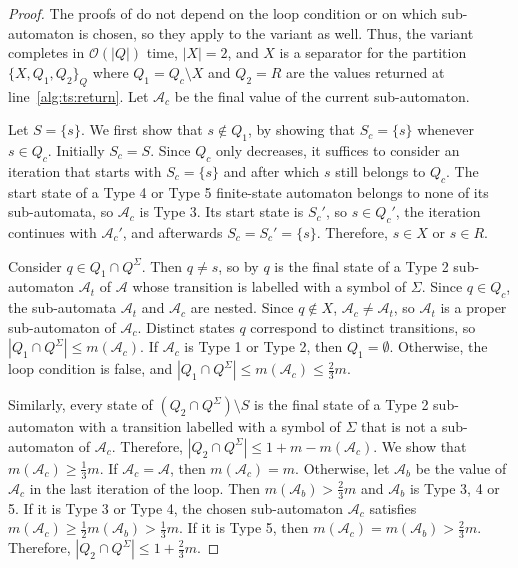 \begin{proof}
  The proofs of
  do not depend on the loop condition or on which sub-automaton is chosen, so they
  apply to the variant as well. Thus, the variant completes in $\mathcal{O}(|Q|)$ time,
  $|X| = 2$, and $X$ is a separator for the partition $\{ X, Q_1, Q_2 \}_Q$ where $Q_1 =
  Q_c \setminus X$ and $Q_2 = R$ are the values returned at line~\ref{alg:ts:return}.
  Let $\mathcal{A}_c$ be the final value of the current sub-automaton.

  Let $S = \{ s \}$. We first show that $s \not\in Q_1$, by showing that $S_c = \{ s
  \}$ whenever $s \in Q_c$. Initially $S_c = S$. Since $Q_c$ only decreases, it
  suffices to consider an iteration that starts with $S_c = \{ s \}$ and after which
  $s$ still belongs to $Q_c$. The start state of a Type 4 or Type 5 finite-state
  automaton belongs to none of its sub-automata, so $\mathcal{A}_c$ is Type 3. Its
  start state is $S_c'$, so $s \in Q_c'$, the iteration continues with
  $\mathcal{A}_c'$, and afterwards $S_c = S_c' = \{ s \}$. Therefore, $s \in X$ or $s
  \in R$.

  Consider $q \in Q_1 \cap Q^\Sigma$. Then $q \neq s$, so by
   $q$ is the final state of a Type 2 sub-automaton
  $\mathcal{A}_t$ of $\mathcal{A}$ whose transition is labelled with a symbol of
  $\Sigma$. Since $q \in Q_c$, the sub-automata $\mathcal{A}_t$ and $\mathcal{A}_c$ are
  nested. Since $q \not\in X$, $\mathcal{A}_c \neq \mathcal{A}_t$, so $\mathcal{A}_t$ is
  a proper sub-automaton of $\mathcal{A}_c$. Distinct states $q$ correspond to distinct
  transitions, so $|Q_1 \cap Q^\Sigma| \leq m(\mathcal{A}_c)$. If $\mathcal{A}_c$ is
  Type 1 or Type 2, then $Q_1 = \emptyset$. Otherwise, the loop condition is false, and
  $|Q_1 \cap Q^\Sigma| \leq m(\mathcal{A}_c) \leq \frac{2}{3} m$.

  Similarly, every state of $(Q_2 \cap Q^\Sigma) \setminus S$ is the final state of a
  Type 2 sub-automaton with a transition labelled with a symbol of $\Sigma$ that is not
  a sub-automaton of $\mathcal{A}_c$. Therefore, $|Q_2 \cap Q^\Sigma| \leq 1 + m -
  m(\mathcal{A}_c)$. We show that $m(\mathcal{A}_c) \geq \frac{1}{3} m$. If
  $\mathcal{A}_c = \mathcal{A}$, then $m(\mathcal{A}_c) = m$. Otherwise, let
  $\mathcal{A}_b$ be the value of $\mathcal{A}_c$ in the last iteration of the loop.
  Then $m(\mathcal{A}_b) > \frac{2}{3} m$ and $\mathcal{A}_b$ is Type 3, 4 or 5. If it
  is Type 3 or Type 4, the chosen sub-automaton $\mathcal{A}_c$ satisfies
  $m(\mathcal{A}_c) \geq \frac{1}{2} m(\mathcal{A}_b) > \frac{1}{3} m$. If it is Type 5,
  then $m(\mathcal{A}_c) = m(\mathcal{A}_b) > \frac{2}{3} m$. Therefore, $|Q_2 \cap
  Q^\Sigma| \leq 1 + \frac{2}{3} m$.
\end{proof}

